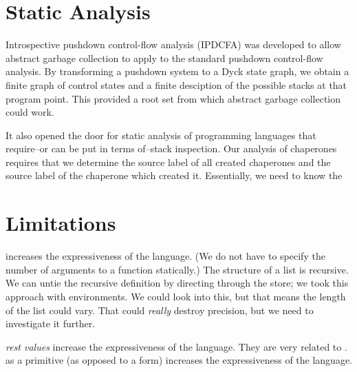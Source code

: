 \documentclass{sigplanconf}
\begin{document}


\section{Static Analysis}

Introspective pushdown control-flow analysis (IPDCFA) was developed to allow abstract garbage collection to apply to the standard pushdown control-flow analysis.
By transforming a pushdown system to a Dyck state graph, we obtain a finite graph of control states and a finite desciption of the possible stacks at that program point.
This provided a root set from which abstract garbage collection could work.

It also opened the door for static analysis of programming languages that require--or can be put in terms of--stack inspection.
Our analysis of chaperones requires that we determine the source label of all created chaperones and the source label of the chaperone which created it.
Essentially, we need to know the 

\section{Limitations}

 increases the expressiveness of the language.
(We do not have to specify the number of arguments to a function statically.)
The structure of a list is recursive.
We can untie the recursive definition by directing through the store; we took this approach with environments.
We could look into this, but that means the length of the list could vary.
That could \emph{really} destroy precision, but we need to investigate it further.

\emph{rest values} increase the expressiveness of the language. They are very related to .
 as a primitive (as opposed to a form) increases the expressiveness of the language.
\end{document}
